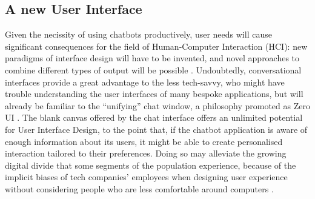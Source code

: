 \subsection{A new User Interface}
Given the necissity of using chatbots productively, user needs will cause significant consequences for the field of Human-Computer Interaction (HCI): new paradigms of interface design will have to be invented, and novel approaches to combine different types of output will be possible \cite{Følstad2017}. Undoubtedly, conversational interfaces provide a great advantage to the less tech-savvy, who might have trouble understanding the user interfaces of many bespoke applications, but will already be familiar to the ``unifying'' chat window, a philosophy promoted as Zero UI \cite{zeroui}. The blank canvas offered by the chat interface offers an unlimited potential for User Interface Design, to the point that, if the chatbot application is aware of enough information about its users, it might be able to create personalised interaction tailored to their preferences. Doing so may alleviate the growing digital divide that some segments of the population experience, because of the implicit biases of tech companies' employees when designing user experience without considering people who are less comfortable around computers \cite{Brandtzaeg2011}.
